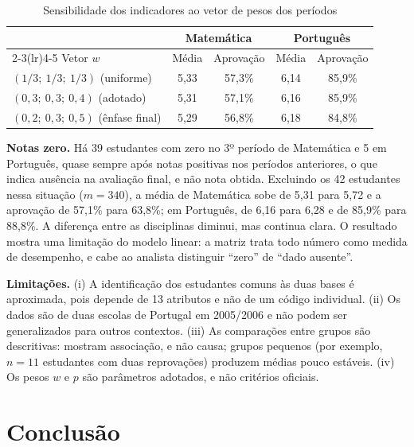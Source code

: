 \documentclass[12pt,a4paper]{article}
\newcommand{\fonte}[1]{\par\vspace{2pt}{\footnotesize Fonte: #1\par}}
\begin{document}
\begin{table}[htbp]
\centering
\caption{Sensibilidade dos indicadores ao vetor de pesos dos períodos}
\label{tab:sens}
\begin{singlespace}\small
\begin{tabular}{lcccc}
\toprule
 & \multicolumn{2}{c}{Matemática} & \multicolumn{2}{c}{Português}\\
\cmidrule(lr){2-3}\cmidrule(lr){4-5}
Vetor $w$ & Média & Aprovação & Média & Aprovação\\
\midrule
$(1/3;\ 1/3;\ 1/3)$ (uniforme) & 5,33 & 57,3\% & 6,14 & 85,9\%\\
$(0{,}3;\ 0{,}3;\ 0{,}4)$ (adotado) & 5,31 & 57,1\% & 6,16 & 85,9\%\\
$(0{,}2;\ 0{,}3;\ 0{,}5)$ (ênfase final) & 5,29 & 56,8\% & 6,18 & 84,8\%\\
\bottomrule
\end{tabular}
\end{singlespace}
\fonte{elaborada pelos autores a partir dos resultados do código (2026).}
\end{table}

\textbf{Notas zero.} Há 39 estudantes com zero no 3º período de Matemática e 5 em Português, quase sempre após notas positivas nos períodos anteriores, o que indica ausência na avaliação final, e não nota obtida. Excluindo os 42 estudantes nessa situação ($m=340$), a média de Matemática sobe de 5,31 para 5,72 e a aprovação de 57,1\% para 63,8\%; em Português, de 6,16 para 6,28 e de 85,9\% para 88,8\%. A diferença entre as disciplinas diminui, mas continua clara. O resultado mostra uma limitação do modelo linear: a matriz trata todo número como medida de desempenho, e cabe ao analista distinguir ``zero'' de ``dado ausente''.

\textbf{Limitações.} (i) A identificação dos estudantes comuns às duas bases é aproximada, pois depende de 13 atributos e não de um código individual. (ii) Os dados são de duas escolas de Portugal em 2005/2006 e não podem ser generalizados para outros contextos. (iii) As comparações entre grupos são descritivas: mostram associação, e não causa; grupos pequenos (por exemplo, $n=11$ estudantes com duas reprovações) produzem médias pouco estáveis. (iv) Os pesos $w$ e $p$ são parâmetros adotados, e não critérios oficiais.

\section{Conclusão}
\end{document}
